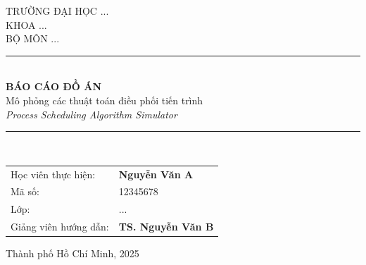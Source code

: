 \begin{titlepage}
\begin{center}

\vspace*{1cm}

{\Large TRƯỜNG ĐẠI HỌC ...}\\[0.3cm]
{\large KHOA ...}\\[0.3cm]
{\large BỘ MÔN ...}\\[1.5cm]

\rule{\textwidth}{1pt}\\[0.5cm]
{\Huge \bfseries BÁO CÁO ĐỒ ÁN}\\[0.3cm]
{\Large Mô phỏng các thuật toán điều phối tiến trình}\\[0.2cm]
{\large \textit{Process Scheduling Algorithm Simulator}}\\[0.3cm]
\rule{\textwidth}{1pt}\\[1.5cm]

\vfill

\begin{tabular}{l l}
Học viên thực hiện: & \textbf{Nguyễn Văn A} \\
Mã số: & 12345678 \\
Lớp: & ... \\
Giảng viên hướng dẫn: & \textbf{TS. Nguyễn Văn B} \\
\end{tabular}

\vfill

{\large Thành phố Hồ Chí Minh, 2025}

\end{center}
\end{titlepage}
